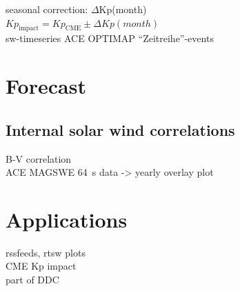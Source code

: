 seasonal correction: $\Delta$Kp(month)\\
$Kp_\text{impact} = Kp_\text{CME} \pm \Delta Kp(month)$\\

sw-timeseries ACE OPTIMAP ``Zeitreihe''-events

\section{Forecast}

\subsection{Internal solar wind correlations}
B-V correlation\\
ACE MAGSWE 64~s data -> yearly overlay plot\\

\section{Applications}
rssfeeds, rtsw plots\\
CME Kp impact\\
part of DDC\\

